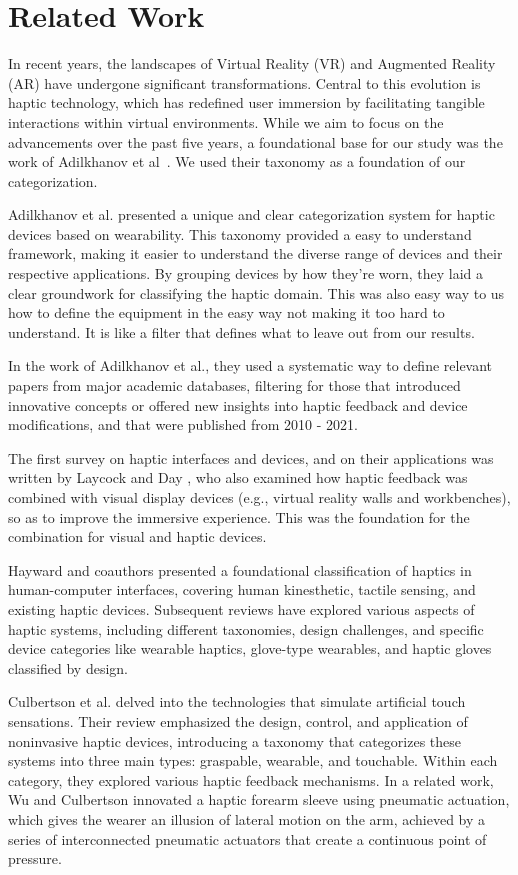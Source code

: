 \section{Related Work}
\label{sec:rel_work}

In recent years, the landscapes of Virtual Reality (VR) and Augmented Reality (AR) have undergone significant transformations. Central to this evolution is haptic technology, which has redefined user immersion by facilitating tangible interactions within virtual environments. While we aim to focus on the advancements over the past five years, a foundational base for our study was the work of Adilkhanov et al~\cite{Adilkhanov22}. We used their taxonomy as a foundation of our categorization.

Adilkhanov et al. presented a unique and clear categorization system for haptic devices based on wearability. This taxonomy provided a easy to understand framework, making it easier to understand the diverse range of devices and their respective applications. By grouping devices by how they're worn, they laid a clear groundwork for classifying the haptic domain. This was also easy way to us how to define the equipment in the easy way not making it too hard to understand. It is like a filter that defines what to leave out from our results.

In the work of Adilkhanov et al., they used a systematic way to define relevant papers from major academic databases, filtering for those that introduced innovative concepts or offered new insights into haptic feedback and device modifications, and that were published from 2010 - 2021.

The first survey on haptic interfaces and devices, and on their applications was written by Laycock and Day , who also examined how haptic feedback was combined with visual display devices (e.g., virtual reality walls and workbenches), so as to improve the immersive experience. This was the foundation for the combination for visual and haptic devices.

Hayward and coauthors presented a foundational classification of haptics in human-computer interfaces, covering human kinesthetic, tactile sensing, and existing haptic devices. Subsequent reviews have explored various aspects of haptic systems, including different taxonomies, design challenges, and specific device categories like wearable haptics, glove-type wearables, and haptic gloves classified by design.

Culbertson et al. delved into the technologies that simulate artificial touch sensations. Their review emphasized the design, control, and application of noninvasive haptic devices, introducing a taxonomy that categorizes these systems into three main types: graspable, wearable, and touchable. Within each category, they explored various haptic feedback mechanisms. In a related work, Wu and Culbertson innovated a haptic forearm sleeve using pneumatic actuation, which gives the wearer an illusion of lateral motion on the arm, achieved by a series of interconnected pneumatic actuators that create a continuous point of pressure.
